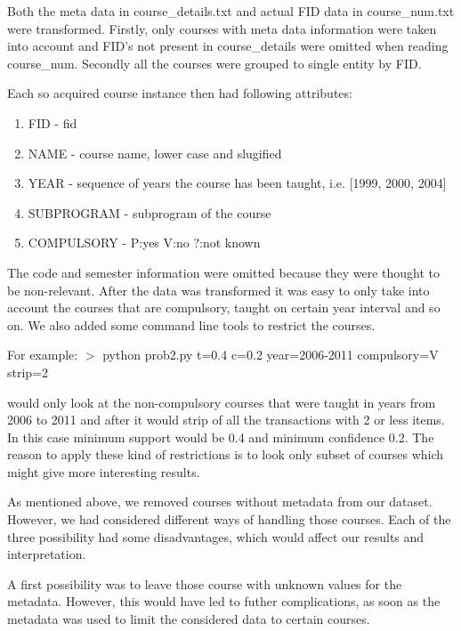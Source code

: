 Both the meta data in course\_details.txt and actual FID data in course\_num.txt were transformed.
Firstly, only courses with meta data information were taken into account and FID's not present in
course\_details were omitted when reading course\_num. Secondly all the courses were grouped 
to single entity by FID. 

Each so acquired course instance then had following attributes:
\begin{enumerate}
\item FID - fid
\item NAME - course name, lower case and slugified
\item YEAR - sequence of years the course has been taught, i.e. [1999, 2000, 2004]
\item SUBPROGRAM - subprogram of the course
\item COMPULSORY - P:yes V:no ?:not known
\end{enumerate}

The code and semester information were omitted because they were thought to be non-relevant.
After the data was transformed it was easy to only take into account the courses that are
compulsory, taught on certain year interval and so on. We also added some command line tools to restrict the courses. 
\newline

For example:\newline
$>$ python prob2.py t=0.4 c=0.2 year=2006-2011 compulsory=V strip=2
\newline

would only look at the non-compulsory courses that were taught in years from 2006 to 2011 and 
after it would strip of all the transactions with 2 or less items.  In this case minimum support would be
0.4 and minimum confidence 0.2. The reason to apply these kind of restrictions is to look only 
subset of courses which might give more interesting results.
\newline


As mentioned above, we removed courses without metadata from our dataset. However, we had considered different ways of handling those courses.
Each of the three possibility had some disadvantages, which would affect our results and interpretation.


A first possibility was to leave those course with unknown values for the metadata. However, this would have led to 
futher complications, as soon as the metadata was used to limit the considered data to certain courses. 


